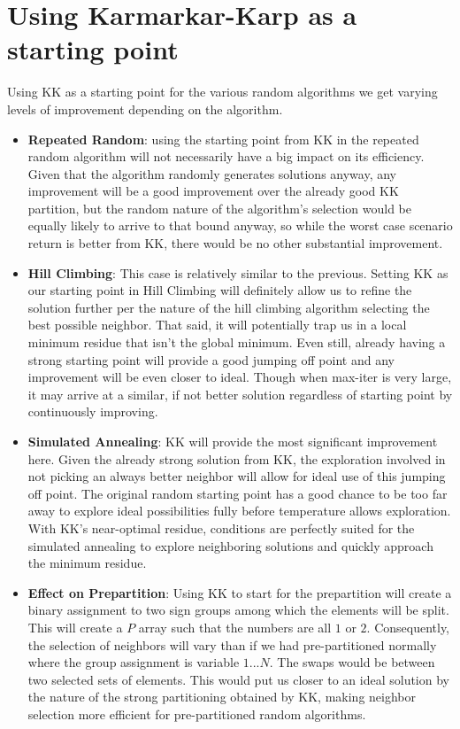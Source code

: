 \documentclass[11pt]{scrartcl}
\theoremstyle{dotlessP}
\theoremstyle{dotlessN}
\theoremstyle{dotN}
\begin{document}
\section{Using Karmarkar-Karp as a starting point}
Using KK as a starting point for the various random algorithms we get varying levels of improvement depending on the algorithm.
\begin{itemize}
    \item \textbf{Repeated Random}: using the starting point from KK in the repeated random algorithm will not necessarily have a big impact on its efficiency. Given that the algorithm randomly generates solutions anyway, any improvement will be a good improvement over the already good KK partition, but the random nature of the algorithm's selection would be equally likely to arrive to that bound anyway, so while the worst case scenario return is better from KK, there would be no other substantial improvement. 
    \item  \textbf{Hill Climbing}: This case is relatively similar to the previous. Setting KK as our starting point in Hill Climbing will definitely allow us to refine the solution further per the nature of the hill climbing algorithm selecting the best possible neighbor. That said, it will potentially trap us in a local minimum residue that isn't the global minimum. Even still, already having a strong starting point will provide a good jumping off point and any improvement will be even closer to ideal. Though when max-iter is very large, it may arrive at a similar, if not better solution regardless of starting point by continuously improving. 
    \item \textbf{Simulated Annealing}: KK will provide the most significant improvement here. Given the already strong solution from KK, the exploration involved in not picking an always better neighbor will allow for ideal use of this jumping off point. The original random starting point has a good chance to be too far away to explore ideal possibilities fully before temperature allows exploration. With KK's near-optimal residue, conditions are perfectly suited for the simulated annealing to explore neighboring solutions and quickly approach the minimum residue. 
    \item \textbf{Effect on Prepartition}: Using KK to start for the prepartition will create a binary assignment to two sign groups among which the elements will be split. This will create a $P$ array such that the numbers are all $1$ or $2$. Consequently, the selection of neighbors will vary than if we had pre-partitioned normally where the group assignment is variable $1...N$. The swaps would be between two selected sets of elements. This would put us closer to an ideal solution by the nature of the strong partitioning obtained by KK, making neighbor selection more efficient for pre-partitioned random algorithms. 
\end{itemize}
\end{document}
